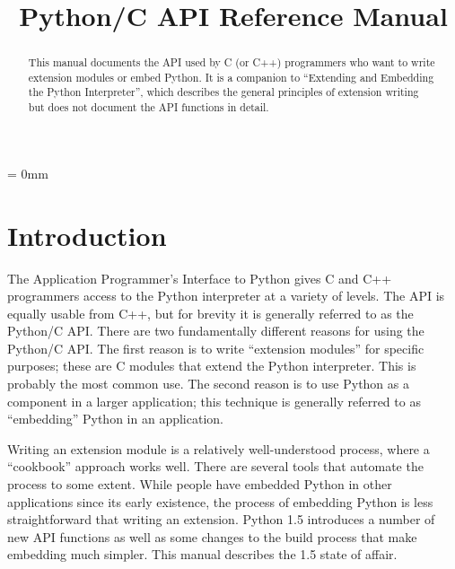 
\title{Python/C API Reference Manual}



\makeindex			%





\maketitle



\begin{abstract}

\noindent
This manual documents the API used by C (or C++) programmers who want
to write extension modules or embed Python.  It is a companion to
``Extending and Embedding the Python Interpreter'', which describes
the general principles of extension writing but does not document the
API functions in detail.

\end{abstract}

\pagebreak

{
\parskip = 0mm
\tableofcontents
}

\pagebreak



\chapter{Introduction}

The Application Programmer's Interface to Python gives C and C++
programmers access to the Python interpreter at a variety of levels.
The API is equally usable from C++, but for brevity it is generally
referred to as the Python/C API.  There are two fundamentally
different reasons for using the Python/C API.  The first reason is to
write ``extension modules'' for specific purposes; these are C modules
that extend the Python interpreter.  This is probably the most common
use.  The second reason is to use Python as a component in a larger
application; this technique is generally referred to as ``embedding''
Python in an application.

Writing an extension module is a relatively well-understood process, 
where a ``cookbook'' approach works well.  There are several tools 
that automate the process to some extent.  While people have embedded 
Python in other applications since its early existence, the process of 
embedding Python is less straightforward that writing an extension.  
Python 1.5 introduces a number of new API functions as well as some 
changes to the build process that make embedding much simpler.  
This manual describes the 1.5 state of affair.

